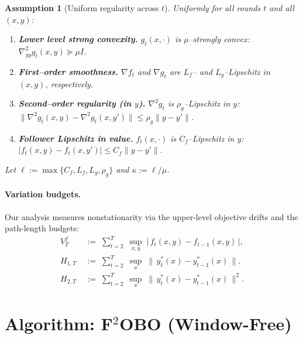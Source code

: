\documentclass{uai2026} %
\newtheorem{assumption}{Assumption}
\begin{document}
\begin{assumption}[Uniform regularity across $t$]\label{ass:offline}
Uniformly for all rounds $t$ and all $(x,y)$:
\begin{enumerate}
\item[\textnormal{(A1)}] \textbf{Lower level strong convexity.} $g_t(x,\cdot)$ is $\mu$–strongly convex: $\nabla^2_{yy} g_t(x,y)\succeq \mu I$.
\item[\textnormal{(A2)}] \textbf{First–order smoothness.} $\nabla f_t$ and $\nabla g_t$ are $L_f$– and $L_g$–Lipschitz in $(x,y)$, respectively.
\item[\textnormal{(A3)}] \textbf{Second–order regularity (in $y$).} $\nabla^2 g_t$ is $\rho_g$–Lipschitz in $y$: 
$\|\nabla^2 g_t(x,y)-\nabla^2 g_t(x,y')\|\le \rho_g\|y-y'\|$.
\item[\textnormal{(A4)}] \textbf{Follower Lipschitz in value.} $f_t(x,\cdot)$ is $C_f$–Lipschitz in $y$:
$|f_t(x,y)-f_t(x,y')|\le C_f\|y-y'\|$.
\end{enumerate}
Let $\ell:=\max\{C_f,L_f,L_g,\rho_g\}$ and $\kappa:=\ell/\mu$.
\end{assumption}

\paragraph{Variation budgets.}
Our analysis measures nonstationarity via the upper-level objective drifts and the path-length budgets:
\begin{align}
V_{T}^{f}\;&:=\;\sum_{t=2}^T\;\sup_{x,y}\;\big|\,f_{t}(x,y)-f_{t-1}(x,y)\,\big|,\label{eq_hyp_obj_seq_len}\\
H_{1,T}\;&:=\;\sum_{t=2}^T\;\sup_{x}\;\big\|\,y_t^{*}(x)-y_{t-1}^{*}(x)\,\big\|.\label{eq_path_len_1}\\
H_{2,T}\;&:=\;\sum_{t=2}^T\;\sup_{x}\;\big\|\,y_t^{*}(x)-y_{t-1}^{*}(x)\,\big\|^2.\label{eq_path_len}
\end{align}

\section{Algorithm: F$^2$OBO (Window-Free)}
\label{sec:algo-window-free}
\end{document}

